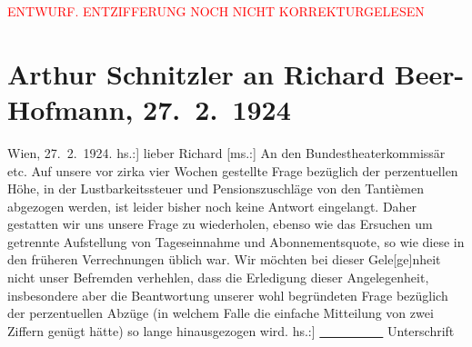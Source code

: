 
\begin{center}
            \textcolor{red}{ENTWURF. ENTZIFFERUNG NOCH NICHT KORREKTURGELESEN}
                      \end{center}
            
               \section[Arthur Schnitzler an Richard Beer-Hofmann, 27. 2. 1924]{ Arthur Schnitzler an Richard Beer-Hofmann, 27. 2. 1924}\nopagebreak{}\rehead{ }\begin{ledgroupsized}[t]{13cm}\normalsize\beginnumbering{} \toendnotes[C]{\smallbreak\pagebreak[2]} 
\toendnotes[C]{\smallbreak}\pstart
           \raggedleft{}{\pb}Wien, 27. 2. 1924.\pend
           \pstart\center{}{[}hs.:{]} lieber Richard\pend\pstart
           {[}ms.:{]} An den Bundestheaterkommissär etc.\pend
           \pstart
           Auf unsere vor zirka vier Wochen gestellte Frage bezüglich der perzentuellen Höhe, in
               der Lustbarkeitssteuer und Pensionszuschläge von den Tantièmen abgezogen werden, ist
               leider bisher noch keine Antwort eingelangt. Daher gestatten wir uns unsere Frage zu
               wiederholen, ebenso wie das Ersuchen um getrennte Aufstellung von Tageseinnahme und
               Abonnementsquote, so wie diese in den früheren Verrechnungen üblich war. Wir möchten
               bei dieser Gele{[}ge{]}nheit nicht unser Befremden verhehlen, dass die
               Erledigung dieser Angelegenheit, insbesondere aber die Beantwortung unserer wohl
               begründeten Frage bezüglich der perzentuellen Abzüge
               (in welchem Falle die einfache Mitteilung von zwei Ziffern genügt hätte) so lange
               hinausgezogen wird.\pend
           \pstart
           \raggedleft{}{[}hs.:{]} \uline{          } Unterschrift\pend
           \pstart

\end{ledgroupsized}

